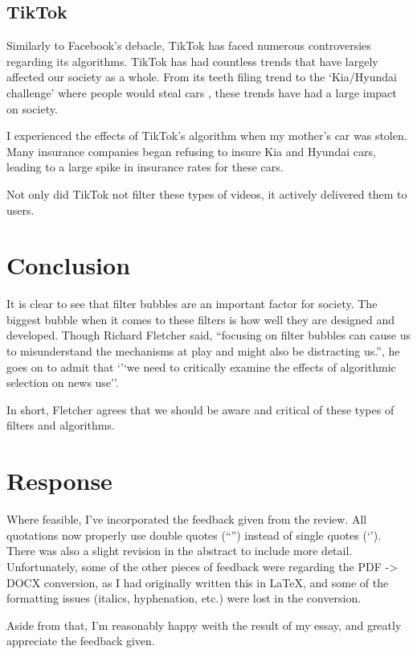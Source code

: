 \documentclass[12pt]{article}
\begin{document}
\subsection{TikTok}
Similarly to Facebook's debacle, TikTok has faced numerous controversies
regarding its algorithms. TikTok has had countless trends that have largely
affected our society as a whole. From its teeth filing trend \cite{wapostteeth}
to the `Kia/Hyundai challenge' where people would steal cars \cite{cnbccars},
these trends have had a large impact on society.

I experienced the effects of TikTok's algorithm when my mother's car was stolen.
Many insurance companies began refusing to insure Kia and Hyundai cars, leading
to a large spike in insurance rates for these cars.

Not only did TikTok not filter these types of videos, it actively delivered them
to users.

\section{Conclusion}
It is clear to see that filter bubbles are an important factor for society. The
biggest bubble when it comes to these filters is how well they are designed and
developed. Though Richard Fletcher said, ``focusing on filter bubbles can cause us
to misunderstand the mechanisms at play and might also be distracting us.'', he
goes on to admit that `'`we need to critically examine the effects of algorithmic
selection on news use''.

In short, Fletcher agrees that we should be aware and critical of these types of
filters and algorithms.

\vfill

\singlespacing

\newpage

\doublespacing

\section*{Response}

Where feasible, I've incorporated the feedback given from the review. All
quotations now properly use double quotes (``'') instead of single quotes (`').
There was also a slight revision in the abstract to include more detail.
Unfortunately, some of the other pieces of feedback were regarding the PDF ->
DOCX conversion, as I had originally written this in \LaTeX, and some of the
formatting issues (italics, hyphenation, etc.) were lost in the conversion.

Aside from that, I'm reasonably happy weith the result of my essay, and greatly
appreciate the feedback given.
\end{document}
